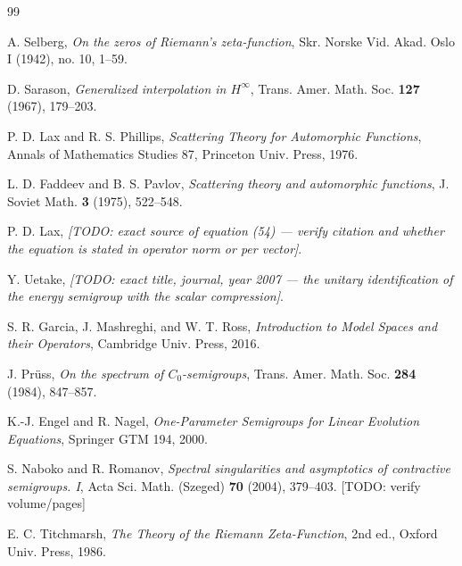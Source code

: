 \documentclass[11pt]{amsart}
\theoremstyle{remark}
\begin{document}
\begin{thebibliography}{99}

 A. Selberg,
\emph{On the zeros of Riemann's zeta-function},
Skr. Norske Vid. Akad. Oslo I (1942), no. 10, 1--59.

 D. Sarason,
\emph{Generalized interpolation in $H^{\infty}$},
Trans. Amer. Math. Soc. \textbf{127} (1967), 179--203.

 P. D. Lax and R. S. Phillips,
\emph{Scattering Theory for Automorphic Functions},
Annals of Mathematics Studies 87, Princeton Univ. Press, 1976.

 L. D. Faddeev and B. S. Pavlov,
\emph{Scattering theory and automorphic functions},
J. Soviet Math. \textbf{3} (1975), 522--548.

 P. D. Lax,
\emph{[TODO: exact source of equation (54) --- verify citation and
whether the equation is stated in operator norm or per vector]}.

 Y. Uetake,
\emph{[TODO: exact title, journal, year 2007 --- the unitary
identification of the energy semigroup with the scalar compression]}.

 S. R. Garcia, J. Mashreghi, and W. T. Ross,
\emph{Introduction to Model Spaces and their Operators},
Cambridge Univ. Press, 2016.

 J. Pr\"uss,
\emph{On the spectrum of $C_{0}$-semigroups},
Trans. Amer. Math. Soc. \textbf{284} (1984), 847--857.

 K.-J. Engel and R. Nagel,
\emph{One-Parameter Semigroups for Linear Evolution Equations},
Springer GTM 194, 2000.

 S. Naboko and R. Romanov,
\emph{Spectral singularities and asymptotics of contractive
semigroups. I},
Acta Sci. Math. (Szeged) \textbf{70} (2004), 379--403.
[TODO: verify volume/pages]

 E. C. Titchmarsh,
\emph{The Theory of the Riemann Zeta-Function}, 2nd ed.,
Oxford Univ. Press, 1986.

\end{thebibliography}
\end{document}
